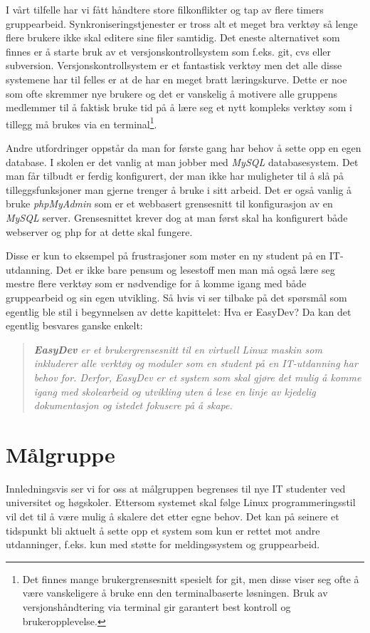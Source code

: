 I vårt tilfelle har vi fått håndtere store filkonflikter og tap av flere timers gruppearbeid. Synkroniseringstjenester er tross alt et meget bra verktøy så lenge flere brukere ikke skal editere sine filer samtidig. Det eneste alternativet som finnes er å starte bruk av et versjonskontrollsystem som f.eks. git, cvs eller subversion. Versjonskontrollsystem er et fantastisk verktøy men det alle disse systemene har til felles er at de har en meget bratt læringskurve. Dette er noe som ofte skremmer nye brukere og det er vanskelig å motivere alle gruppens medlemmer til å faktisk bruke tid på å lære seg et nytt kompleks verktøy som i tillegg må brukes via en terminal\footnote{Det finnes mange brukergrensesnitt spesielt for git, men disse viser seg ofte å være vanskeligere å bruke enn den terminalbaserte løsningen. Bruk av versjonshåndtering via terminal gir garantert best kontroll og brukeropplevelse.}.

Andre utfordringer oppstår da man for første gang har behov å sette opp en egen database. I skolen er det vanlig at man jobber med \textit{MySQL} databasesystem. Det man får tilbudt er ferdig konfigurert, der man ikke har muligheter til å slå på tilleggsfunksjoner man gjerne trenger å bruke i sitt arbeid. Det er også vanlig å bruke \textit{phpMyAdmin} som er et webbasert grensesnitt til konfigurasjon av en \textit{MySQL} server. Grensesnittet krever dog at man først skal ha konfigurert både webserver og php for at dette skal fungere.

Disse er kun to eksempel på frustrasjoner som møter en ny student på en IT-utdanning. Det er ikke bare pensum og lesestoff men man må også lære seg mestre flere verktøy som er nødvendige for å komme igang med både gruppearbeid og sin egen utvikling. Så hvis vi ser tilbake på det spørsmål som egentlig ble stil i begynnelsen av dette kapittelet: Hva er EasyDev? Da kan det egentlig besvares ganske enkelt: 

\begin{quotation}
\emph{\textbf{EasyDev} er et brukergrensesnitt til en virtuell Linux maskin som inkluderer alle verktøy og moduler som en student på en IT-utdanning har behov for. Derfor, EasyDev er et system som skal gjøre det mulig å komme igang med skolearbeid og utvikling uten å lese en linje av kjedelig dokumentasjon og istedet fokusere på å skape.}
\end{quotation}


\section{Målgruppe} \label{sec:målgruppe}
Innledningsvis ser vi for oss at målgruppen begrenses til nye IT studenter ved universitet og høgskoler. Ettersom systemet skal følge Linux programmeringsstil\cite{book:unixprog} vil det til å være mulig å skalere det etter egne behov. Det kan på seinere et tidspunkt bli aktuelt å sette opp et system som kun er rettet mot andre utdanninger, f.eks. kun med støtte for meldingssystem og gruppearbeid.

